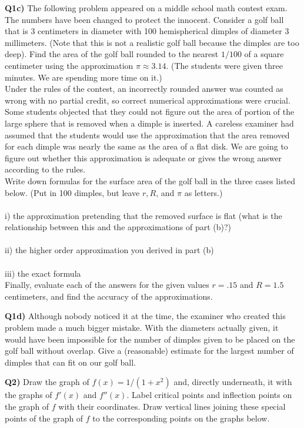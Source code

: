 \documentclass[9pt]{article}
\begin{document}
\begin{tcolorbox}
  \textbf{Q1c)} The following problem appeared on a middle school math contest exam. The numbers have been changed to protect the innocent. Consider a golf ball that is 3 centimeters in diameter with 100 hemispherical dimples of diameter 3 millimeters. (Note that this is not a realistic golf ball because the dimples are too deep). Find the area of the golf ball rounded to the nearest $1/100$ of a square centimeter using the approximation $\pi \approx 3.14$. (The students were given three minutes. We are spending more time on it.) \\

  Under the rules of the contest, an incorrectly rounded answer was counted as wrong with no partial credit, so correct numerical approximations were crucial. Some students objected that they could not figure out the area of portion of the large sphere that is removed when a dimple is inserted. A careless examiner had assumed that the students would use the approximation that the area removed for each dimple was nearly the same as the area of a flat disk. We are going to figure out whether this approximation is adequate or gives the wrong answer according to the rules.\\

  Write down formulas for the surface area of the golf ball in the three cases listed below. (Put in 100 dimples, but leave $r, R$, and $\pi$ as letters.)\\
  \\
  i) the approximation pretending that the removed surface is flat (what is the relationship between this and the approximations of part (b)?)\\
  \\
  ii) the higher order approximation you derived in part (b)\\
  \\
  iii) the exact formula\\

  Finally, evaluate each of the answers for the given values $r = .15$ and $R = 1.5$ centimeters, and find the accuracy of the approximations.
\end{tcolorbox}


\begin{tcolorbox}
  \textbf{Q1d)} Although nobody noticed it at the time, the examiner who created this problem made a much bigger mistake. With the diameters actually given, it would have been impossible for the number of dimples given to be placed on the golf ball without overlap. Give a (reasonable) estimate for the largest number of dimples that can fit on our golf ball.
\end{tcolorbox}


\begin{tcolorbox}
  \textbf{Q2)} Draw the graph of $f(x) = 1/(1 + x^2)$ and, directly underneath, it with the graphs of $f'(x)$ and $f''(x)$. Label critical points and inflection points on the graph of $f$ with their coordinates. Draw vertical lines joining these special points of the graph of $f$ to the corresponding points on the graphs below.
\end{tcolorbox}
\end{document}
